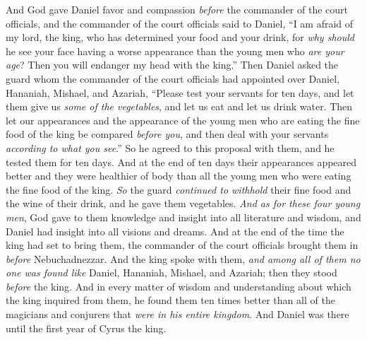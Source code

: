\begin{biblechapter}
\verse And God gave Daniel favor and compassion \textit{before} the commander of the court officials,
\verse and the commander of the court officials said to Daniel, “I am afraid of my lord, the king, who has determined your food and your drink, for \textit{why should} he see your face having a worse appearance than the young men who \textit{are your age}? Then you will endanger my head with the king.”
\verse Then Daniel asked the guard whom the commander of the court officials had appointed over Daniel, Hananiah, Mishael, and Azariah,
\verse “Please test your servants for ten days, and let them give us \textit{some of the vegetables}, and let us eat and let us drink water.
\verse Then let our appearances and the appearance of the young men who are eating the fine food of the king be compared \textit{before you}, and then deal with your servants \textit{according to what you see}.”
\verse So he agreed to this proposal with them, and he tested them for ten days.
\verse And at the end of ten days their appearances appeared better and they were healthier of body than all the young men who were eating the fine food of the king.
\verse \textit{So} the guard \textit{continued to withhold} their fine food and the wine of their drink, and he gave them vegetables.
\verse \textit{And as for these four young men}, God gave to them knowledge and insight into all literature and wisdom, and Daniel had insight into all visions and dreams.
\verse And at the end of the time the king had set to bring them, the commander of the court officials brought them in \textit{before} Nebuchadnezzar.
\verse And the king spoke with them, \textit{and among all of them no one was found like} Daniel, Hananiah, Mishael, and Azariah; then they stood \textit{before} the king.
\verse And in every matter of wisdom and understanding about which the king inquired from them, he found them ten times better than all of the magicians and conjurers that \textit{were in his entire kingdom}.
\verse And Daniel was there until the first year of Cyrus the king.
\end{biblechapter}

